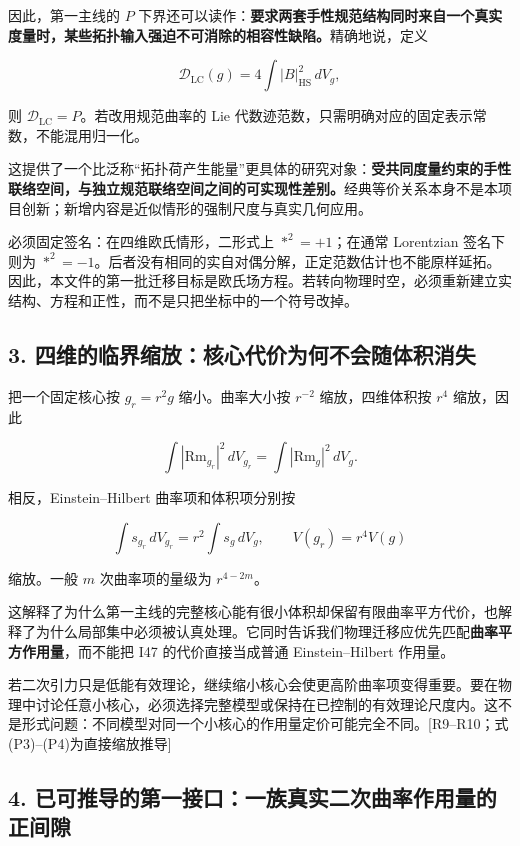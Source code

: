 \documentclass[UTF8,a4paper,11pt,fontset=fandol]{ctexart}
\begin{document}
因此，第一主线的 \(P\)
下界还可以读作：\textbf{要求两套手性规范结构同时来自一个真实度量时，某些拓扑输入强迫不可消除的相容性缺陷。}精确地说，定义

\[
\mathscr D_{\mathrm{LC}}(g)=4\int|B|_{\mathrm{HS}}^2\,dV_g,
\]

则 \(\mathscr D_{\mathrm{LC}}=P\)。若改用规范曲率的 Lie
代数迹范数，只需明确对应的固定表示常数，不能混用归一化。

这提供了一个比泛称``拓扑荷产生能量''更具体的研究对象：\textbf{受共同度量约束的手性联络空间，与独立规范联络空间之间的可实现性差别。}经典等价关系本身不是本项目创新；新增内容是近似情形的强制尺度与真实几何应用。

必须固定签名：在四维欧氏情形，二形式上 \(*^2=+1\)；在通常 Lorentzian
签名下则为
\(*^2=-1\)。后者没有相同的实自对偶分解，正定范数估计也不能原样延拓。因此，本文件的第一批迁移目标是欧氏场方程。若转向物理时空，必须重新建立实结构、方程和正性，而不是只把坐标中的一个符号改掉。

\subsection{3.
四维的临界缩放：核心代价为何不会随体积消失}\label{ux56dbux7ef4ux7684ux4e34ux754cux7f29ux653eux6838ux5fc3ux4ee3ux4ef7ux4e3aux4f55ux4e0dux4f1aux968fux4f53ux79efux6d88ux5931}

把一个固定核心按 \(g_r=r^2g\) 缩小。曲率大小按 \(r^{-2}\)
缩放，四维体积按 \(r^4\) 缩放，因此

\[
\int|\mathrm{Rm}_{g_r}|^2\,dV_{g_r}
=\int|\mathrm{Rm}_g|^2\,dV_g.
\tag{P3}
\]

相反，Einstein--Hilbert 曲率项和体积项分别按

\[
\int s_{g_r}\,dV_{g_r}=r^2\int s_g\,dV_g,
\qquad V(g_r)=r^4V(g)
\tag{P4}
\]

缩放。一般 \(m\) 次曲率项的量级为 \(r^{4-2m}\)。

这解释了为什么第一主线的完整核心能有很小体积却保留有限曲率平方代价，也解释了为什么局部集中必须被认真处理。它同时告诉我们物理迁移应优先匹配\textbf{曲率平方作用量}，而不能把
I47 的代价直接当成普通 Einstein--Hilbert 作用量。

若二次引力只是低能有效理论，继续缩小核心会使更高阶曲率项变得重要。要在物理中讨论任意小核心，必须选择完整模型或保持在已控制的有效理论尺度内。这不是形式问题：不同模型对同一个小核心的作用量定价可能完全不同。{[}R9--R10；式(P3)--(P4)为直接缩放推导{]}

\subsection{4.
已可推导的第一接口：一族真实二次曲率作用量的正间隙}\label{ux5df2ux53efux63a8ux5bfcux7684ux7b2cux4e00ux63a5ux53e3ux4e00ux65cfux771fux5b9eux4e8cux6b21ux66f2ux7387ux4f5cux7528ux91cfux7684ux6b63ux95f4ux9699}
\end{document}
